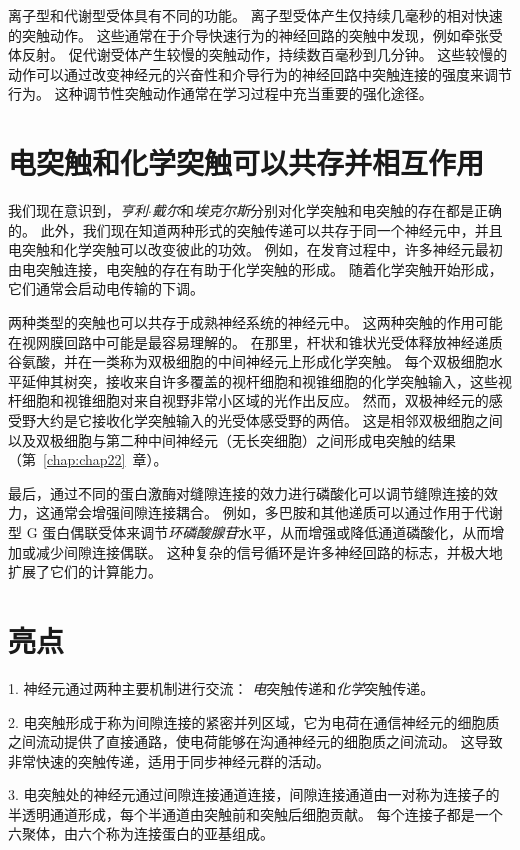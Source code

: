 离子型和代谢型受体具有不同的功能。
离子型受体产生仅持续几毫秒的相对快速的突触动作。
这些通常在于介导快速行为的神经回路的突触中发现，例如牵张受体反射。
促代谢受体产生较慢的突触动作，持续数百毫秒到几分钟。
这些较慢的动作可以通过改变神经元的兴奋性和介导行为的神经回路中突触连接的强度来调节行为。
这种调节性突触动作通常在学习过程中充当重要的强化途径。




\section{电突触和化学突触可以共存并相互作用}

我们现在意识到，\textit{亨利$\cdot$戴尔}和\textit{埃克尔斯}分别对化学突触和电突触的存在都是正确的。
此外，我们现在知道两种形式的突触传递可以共存于同一个神经元中，并且电突触和化学突触可以改变彼此的功效。
例如，在发育过程中，许多神经元最初由电突触连接，电突触的存在有助于化学突触的形成。
随着化学突触开始形成，它们通常会启动电传输的下调。


两种类型的突触也可以共存于成熟神经系统的神经元中。 
这两种突触的作用可能在视网膜回路中可能是最容易理解的。
在那里，杆状和锥状光受体释放神经递质谷氨酸，并在一类称为双极细胞的中间神经元上形成化学突触。
每个双极细胞水平延伸其树突，接收来自许多覆盖的视杆细胞和视锥细胞的化学突触输入，这些视杆细胞和视锥细胞对来自视野非常小区域的光作出反应。
然而，双极神经元的感受野大约是它接收化学突触输入的光受体感受野的两倍。
这是相邻双极细胞之间以及双极细胞与第二种中间神经元（无长突细胞）之间形成电突触的结果（第~\ref{chap:chap22}~章）。


最后，通过不同的蛋白激酶对缝隙连接的效力进行磷酸化可以调节缝隙连接的效力，这通常会增强间隙连接耦合。
例如，多巴胺和其他递质可以通过作用于代谢型 G 蛋白偶联受体来调节\textit{环磷酸腺苷}水平，从而增强或降低通道磷酸化，从而增加或减少间隙连接偶联。
这种复杂的信号循环是许多神经回路的标志，并极大地扩展了它们的计算能力。



\section{亮点}

1. 神经元通过两种主要机制进行交流：
\textit{电}突触传递和\textit{化学}突触传递。


2. 电突触形成于称为间隙连接的紧密并列区域，它为电荷在通信神经元的细胞质之间流动提供了直接通路，使电荷能够在沟通神经元的细胞质之间流动。
这导致非常快速的突触传递，适用于同步神经元群的活动。 


3. 电突触处的神经元通过间隙连接通道连接，间隙连接通道由一对称为连接子的半透明通道形成，每个半通道由突触前和突触后细胞贡献。
每个连接子都是一个六聚体，由六个称为连接蛋白的亚基组成。 


